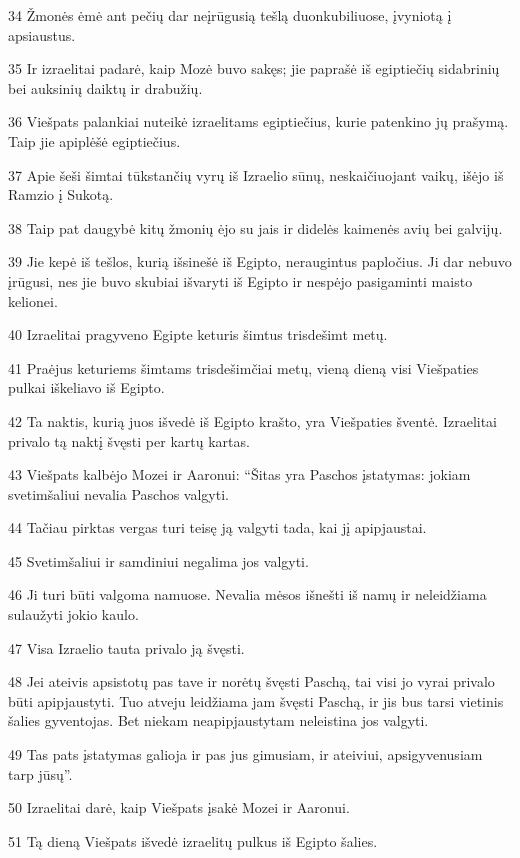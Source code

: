 \par 34 Žmonės ėmė ant pečių dar neįrūgusią tešlą duonkubiliuose, įvyniotą į apsiaustus. 
\par 35 Ir izraelitai padarė, kaip Mozė buvo sakęs; jie paprašė iš egiptiečių sidabrinių bei auksinių daiktų ir drabužių. 
\par 36 Viešpats palankiai nuteikė izraelitams egiptiečius, kurie patenkino jų prašymą. Taip jie apiplėšė egiptiečius. 
\par 37 Apie šeši šimtai tūkstančių vyrų iš Izraelio sūnų, neskaičiuojant vaikų, išėjo iš Ramzio į Sukotą. 
\par 38 Taip pat daugybė kitų žmonių ėjo su jais ir didelės kaimenės avių bei galvijų. 
\par 39 Jie kepė iš tešlos, kurią išsinešė iš Egipto, neraugintus papločius. Ji dar nebuvo įrūgusi, nes jie buvo skubiai išvaryti iš Egipto ir nespėjo pasigaminti maisto kelionei. 
\par 40 Izraelitai pragyveno Egipte keturis šimtus trisdešimt metų. 
\par 41 Praėjus keturiems šimtams trisdešimčiai metų, vieną dieną visi Viešpaties pulkai iškeliavo iš Egipto. 
\par 42 Ta naktis, kurią juos išvedė iš Egipto krašto, yra Viešpaties šventė. Izraelitai privalo tą naktį švęsti per kartų kartas. 
\par 43 Viešpats kalbėjo Mozei ir Aaronui: “Šitas yra Paschos įstatymas: jokiam svetimšaliui nevalia Paschos valgyti. 
\par 44 Tačiau pirktas vergas turi teisę ją valgyti tada, kai jį apipjaustai. 
\par 45 Svetimšaliui ir samdiniui negalima jos valgyti. 
\par 46 Ji turi būti valgoma namuose. Nevalia mėsos išnešti iš namų ir neleidžiama sulaužyti jokio kaulo. 
\par 47 Visa Izraelio tauta privalo ją švęsti. 
\par 48 Jei ateivis apsistotų pas tave ir norėtų švęsti Paschą, tai visi jo vyrai privalo būti apipjaustyti. Tuo atveju leidžiama jam švęsti Paschą, ir jis bus tarsi vietinis šalies gyventojas. Bet niekam neapipjaustytam neleistina jos valgyti. 
\par 49 Tas pats įstatymas galioja ir pas jus gimusiam, ir ateiviui, apsigyvenusiam tarp jūsų”. 
\par 50 Izraelitai darė, kaip Viešpats įsakė Mozei ir Aaronui. 
\par 51 Tą dieną Viešpats išvedė izraelitų pulkus iš Egipto šalies.




